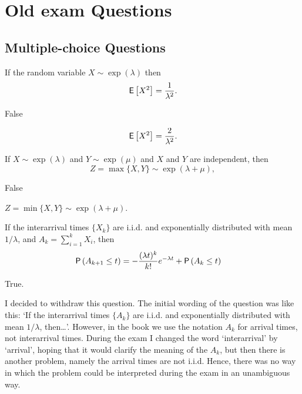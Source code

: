 \section{Old exam Questions}

\subsection{Multiple-choice Questions}

\begin{exercise}[201703] 
  If the random variable $X\sim\exp(\lambda)$ then
  \begin{equation*}
  \,\mathsf{E}\left[X^2\right]= \frac{1}{\lambda^2}.
  \end{equation*}
  \begin{solution}
    False

  \begin{equation*}
  \,\mathsf{E}\left[X^2\right]= \frac{2}{\lambda^2}.
  \end{equation*}

  \end{solution}
\end{exercise}

\begin{exercise}[201703]
  If $X\sim\exp(\lambda)$ and $Y\sim\exp(\mu)$ and $X$ and $Y$ are
  independent, then
  \begin{equation*}
Z=\max\{X,Y\}\sim\exp(\lambda+\mu),
  \end{equation*}
  \begin{solution}
    False

$Z=\min\{X,Y\} \sim \exp(\lambda+\mu)$.

  \end{solution}
\end{exercise}

\begin{exercise}[201703]
  If the interarrival times $\{X_k\}$ are i.i.d. and exponentially
  distributed with mean $1/\lambda$, and $A_k = \sum_{i=1}^k X_i$, then 
\begin{equation*}
  \begin{split}
\P{A_{k+1} \leq t} 
&= - \frac{(\lambda t)^{k}}{k!} e^{-\lambda t} + \P{A_k \leq t}
  \end{split}
\end{equation*}
  \begin{solution}
    True. 

    I decided to withdraw this question. The initial wording of the
    question was like this: `If the interarrival times $\{A_k\}$ are
    i.i.d. and exponentially distributed with mean $1/\lambda$,
    then\ldots'. However, in the book we use the notation $A_k$ for
    arrival times, not interarrival times. During the exam I changed
    the word `interarrival' by `arrival', hoping that it would clarify
    the meaning of the $A_k$, but then there is another problem,
    namely the arrival times are not i.i.d.  Hence, there was no way
    in which the problem could be interpreted during the exam in an
    unambiguous way. 
  \end{solution}
\end{exercise}

